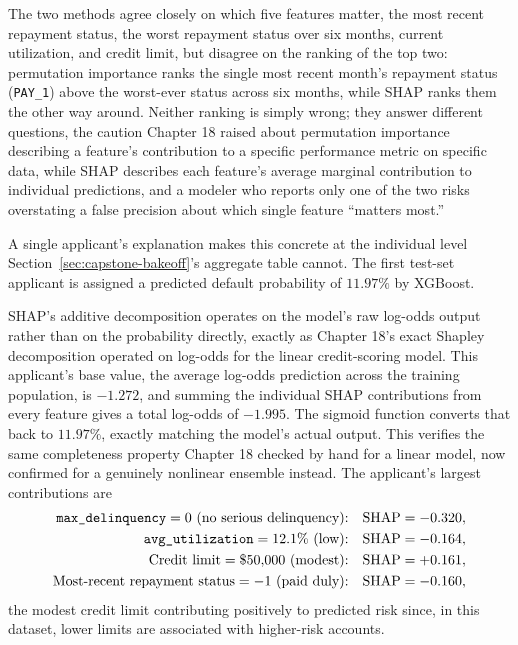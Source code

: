 \documentclass[../ai_in_finance]{subfiles}
\begin{document}
The two methods agree closely on which five features matter, the most recent repayment status, the worst repayment status over six months, current utilization, and credit limit, but disagree on the ranking of the top two: permutation importance ranks the single most recent month's repayment status (\texttt{PAY\_1}) above the worst-ever status across six months, while SHAP ranks them the other way around. Neither ranking is simply wrong; they answer different questions, the caution Chapter 18 raised about permutation importance describing a feature's contribution to a specific performance metric on specific data, while SHAP describes each feature's average marginal contribution to individual predictions, and a modeler who reports only one of the two risks overstating a false precision about which single feature ``matters most.''

A single applicant's explanation makes this concrete at the individual level Section~\ref{sec:capstone-bakeoff}'s aggregate table cannot. The first test-set applicant is assigned a predicted default probability of $11.97\%$ by XGBoost.

SHAP's additive decomposition operates on the model's raw log-odds output rather than on the probability directly, exactly as Chapter 18's exact Shapley decomposition operated on log-odds for the linear credit-scoring model. This applicant's base value, the average log-odds prediction across the training population, is $-1.272$, and summing the individual SHAP contributions from every feature gives a total log-odds of $-1.995$. The sigmoid function converts that back to $11.97\%$, exactly matching the model's actual output. This verifies the same completeness property Chapter 18 checked by hand for a linear model, now confirmed for a genuinely nonlinear ensemble instead. The applicant's largest contributions are
\begin{align*}
\texttt{max\_\allowbreak delinquency} = 0 \text{ (no serious delinquency):} &\quad \text{SHAP} = -0.320, \\
\texttt{avg\_utilization} = 12.1\% \text{ (low):} &\quad \text{SHAP} = -0.164, \\
\text{Credit limit} = \$50{,}000 \text{ (modest):} &\quad \text{SHAP} = +0.161, \\
\text{Most-recent repayment status} = -1 \text{ (paid duly):} &\quad \text{SHAP} = -0.160,
\end{align*}
the modest credit limit contributing positively to predicted risk since, in this dataset, lower limits are associated with higher-risk accounts.
\end{document}
